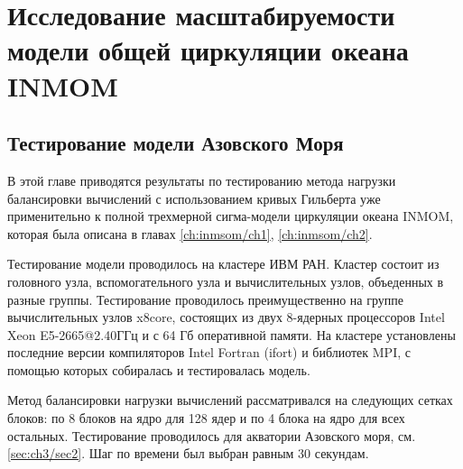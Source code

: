 \chapter{Исследование масштабируемости модели общей циркуляции океана INMOM}\label{ch:inmsom/ch3}

\section{Тестирование модели Азовского Моря}\label{sec:inmsom/ch3/sec1}

	В этой главе приводятся результаты по тестированию метода нагрузки балансировки вычислений  с использованием кривых Гильберта уже применительно к полной трехмерной сигма-модели циркуляции океана INMOM, которая была описана в главах \ref{ch:inmsom/ch1}, \ref{ch:inmsom/ch2}.
	
	Тестирование модели проводилось на кластере ИВМ РАН. Кластер состоит из головного узла, вспомогательного узла и вычислительных узлов,
	объеденных в разные группы. Тестирование проводилось преимущественно на группе вычислительных узлов x8core, состоящих из двух 8-ядерных процессоров Intel Xeon E5-2665@2.40ГГц
	и с 64 Гб оперативной памяти.
	На кластере установлены последние версии компиляторов Intel Fortran (ifort) и библиотек MPI, с помощью
	которых собиралась и тестировалась модель.
	
	Метод балансировки нагрузки вычислений рассматривался на следующих сетках блоков:
	по 8 блоков на ядро для 128 ядер и по 4 блока на ядро для всех остальных. 
	Тестирование проводилось для акватории Азовского моря, см. \ref{sec:ch3/sec2}. Шаг по времени был выбран равным 30 секундам.
	
	
